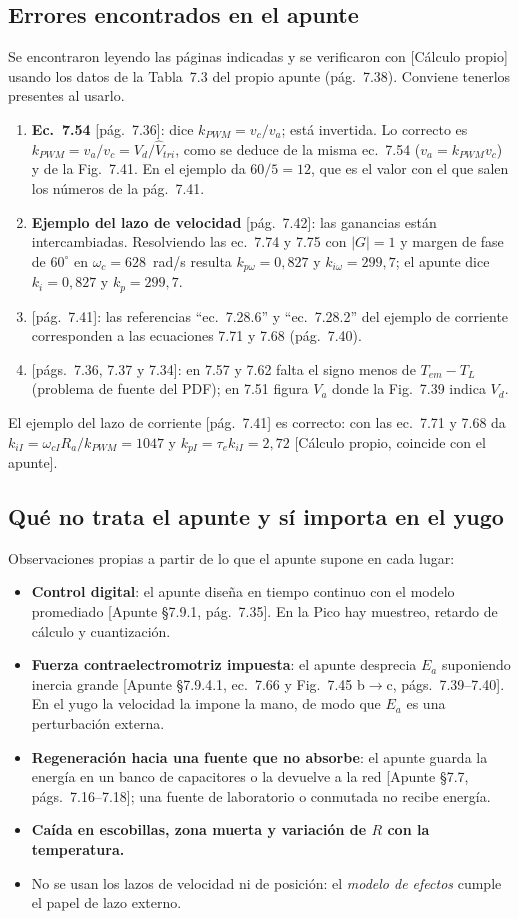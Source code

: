\documentclass[11pt,a4paper]{article}
\newcommand{\fuente}[1]{{\footnotesize\textcolor{black!60}{[#1]}}}
\begin{document}
\subsection{Errores encontrados en el apunte}
Se encontraron leyendo las páginas indicadas y se verificaron con \fuente{Cálculo propio} usando los datos de la Tabla~7.3 del propio apunte (pág.~7.38). Conviene tenerlos presentes al usarlo.
\begin{enumerate}
\item \textbf{Ec.~7.54} \fuente{pág.~7.36}: dice $k_{PWM}=v_c/v_a$; está invertida. Lo correcto es $k_{PWM}=v_a/v_c=V_d/\hat V_{tri}$, como se deduce de la misma ec.~7.54 ($v_a=k_{PWM}v_c$) y de la Fig.~7.41. En el ejemplo da $60/5=12$, que es el valor con el que salen los números de la pág.~7.41.
\item \textbf{Ejemplo del lazo de velocidad} \fuente{pág.~7.42}: las ganancias están intercambiadas. Resolviendo las ec.~7.74 y 7.75 con $|G|=1$ y margen de fase de $60^\circ$ en $\omega_c=628$~rad/s resulta $k_{p\omega}=0{,}827$ y $k_{i\omega}=299{,}7$; el apunte dice $k_i=0{,}827$ y $k_p=299{,}7$.
\item \fuente{pág.~7.41}: las referencias ``ec.~7.28.6'' y ``ec.~7.28.2'' del ejemplo de corriente corresponden a las ecuaciones 7.71 y 7.68 (pág.~7.40).
\item \fuente{págs.~7.36, 7.37 y 7.34}: en 7.57 y 7.62 falta el signo menos de $T_{em}-T_L$ (problema de fuente del PDF); en 7.51 figura $V_a$ donde la Fig.~7.39 indica $V_d$.
\end{enumerate}
El ejemplo del lazo de corriente \fuente{pág.~7.41} es correcto: con las ec.~7.71 y 7.68 da $k_{iI}=\omega_{cI}R_a/k_{PWM}=1047$ y $k_{pI}=\tau_e k_{iI}=2{,}72$ \fuente{Cálculo propio, coincide con el apunte}.

\subsection{Qué no trata el apunte y sí importa en el yugo}
Observaciones propias a partir de lo que el apunte supone en cada lugar:
\begin{itemize}
\item \textbf{Control digital}: el apunte diseña en tiempo continuo con el modelo promediado \fuente{Apunte §7.9.1, pág.~7.35}. En la Pico hay muestreo, retardo de cálculo y cuantización.
\item \textbf{Fuerza contraelectromotriz impuesta}: el apunte desprecia $E_a$ suponiendo inercia grande \fuente{Apunte §7.9.4.1, ec.~7.66 y Fig.~7.45 b$\to$c, págs.~7.39--7.40}. En el yugo la velocidad la impone la mano, de modo que $E_a$ es una perturbación externa.
\item \textbf{Regeneración hacia una fuente que no absorbe}: el apunte guarda la energía en un banco de capacitores o la devuelve a la red \fuente{Apunte §7.7, págs.~7.16--7.18}; una fuente de laboratorio o conmutada no recibe energía.
\item \textbf{Caída en escobillas, zona muerta y variación de $R$ con la temperatura.}
\item No se usan los lazos de velocidad ni de posición: el \emph{modelo de efectos} cumple el papel de lazo externo.
\end{itemize}
\end{document}
